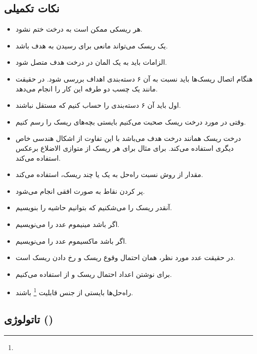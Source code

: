 
\subsection*{نکات تکمیلی}

\begin{itemize}
    \item هر ریسکی ممکن است به درخت ختم نشود.
    \item یک ریسک می‌تواند مانعی برای رسیدن به هدف باشد.
    \item الزامات باید به یک المان در درخت هدف متصل شود.
    \item هنگام اتصال ریسک‌ها باید نسبت به آن ۶ دسته‌بندی اهداف بررسی شود. در
    حقیقت مانند یک چسب دو طرفه این کار را انجام می‌دهد.
    \item اول باید آن ۶ دسته‌بندی را حساب کنیم که مستقل نباشند.
    \item وقتی در مورد درخت ریسک صحبت می‌کنیم بایستی بچه‌های ریسک را رسم کنیم.
    \item درخت ریسک همانند درخت هدف می‌باشد با این تفاوت از اشکال هندسی خاص
    دیگری استفاده می‌کند. برای مثال برای هر ریسک از متوازی الاضلاع برعکس استفاده
    می‌کند.
    \item مقدار  از روش  نسبت راه‌حل به یک یا چند ریسک،
    استفاده می‌کند.
    \item پر کردن نقاط به صورت افقی انجام می‌شود.
    \item آنقدر ریسک را می‌شکنیم که بتوانیم حاشیه را بنویسیم.
    \item اگر  باشد مینیموم عدد را می‌نویسیم.
    \item اگر  باشد ماکسیموم عدد را می‌نویسیم.
    \item در حقیقت عدد مورد نظر، همان احتمال وقوع ریسک و  رخ
    دادن ریسک است.
    \item برای نوشتن اعداد احتمال ریسک و  از 
    استفاده می‌کنیم.
    \item راه‌حل‌ها بایستی از جنس قابلیت \footnote{} باشند.
\end{itemize}



\subsection{تاتولوژی ()}

